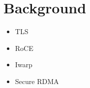 \section{Background}
\label{sec:background}

\begin{itemize}
    \item{TLS}
    \item{RoCE}
    \item{Iwarp}
    \item{Secure RDMA}
\end{itemize}
